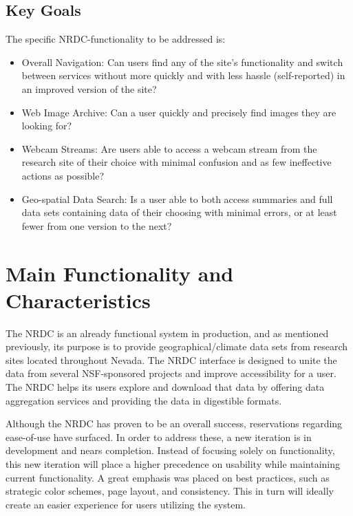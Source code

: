 \documentclass{article}
\begin{document}
\subsection{Key Goals}
The specific NRDC-functionality to be addressed is:
\begin{itemize}
\item Overall Navigation: Can users find any of the site's functionality and switch between services without more quickly and with less hassle (self-reported) in an improved version of the site?

\item Web Image Archive: Can a user quickly and precisely find images they are looking for?

\item Webcam Streams: Are users able to access a webcam stream from the research site of their choice with minimal confusion and as few ineffective actions as possible?

\item Geo-spatial Data Search: Is a user able to both access summaries and full data sets containing data of their choosing with minimal errors, or at least fewer from one version to the next?
\end{itemize}

%
%
\section{Main Functionality and Characteristics}
The NRDC is an already functional system in production, and as mentioned previously, its purpose is to provide geographical/climate data sets from research sites located throughout Nevada. The NRDC interface is designed to unite the data from several NSF-sponsored projects and improve accessibility for a user. The NRDC helps its users explore and download that data by offering data aggregation services and providing the data in digestible formats\cite{microservice-nrdc}.

Although the NRDC has proven to be an overall success, reservations regarding ease-of-use have surfaced. In order to address these, a new iteration is in development and nears completion. Instead of focusing solely on functionality, this new iteration will place a higher precedence on usability while maintaining current functionality. A great emphasis was placed on best practices, such as strategic color schemes, page layout, and consistency\cite{usability.gov}\cite{web-ui-principles}. This in turn will ideally create an easier experience for users utilizing the system.
\end{document}
